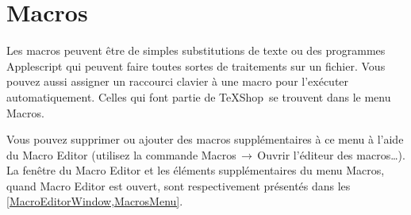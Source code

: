 \documentclass[11pt,french]{article}
\newcommand{\TS}{\textsf{\TeX Shop}}
\newcommand{\mnu}[1]{\textsf{#1}}
\newcommand{\To}{\,\(\to\)\,}
\begin{document}




\section{Macros} 

Les macros peuvent être de simples substitutions de texte ou des programmes Applescript qui peuvent faire toutes sortes de traitements sur un fichier. Vous pouvez aussi assigner un raccourci clavier à une macro pour l'exécuter automatiquement. Celles qui font partie de \TS\ se trouvent dans le menu \mnu{Macros}.

Vous pouvez supprimer ou ajouter des macros supplémentaires à ce menu à l'aide du \mnu{Macro Editor} (utilisez la commande \mnu{Macros}\To\mnu{Ouvrir l'éditeur des macros…}). La fenêtre du \mnu{Macro Editor} et les éléments supplémentaires du menu \mnu{Macros}, quand \mnu{Macro Editor} est ouvert, sont respectivement présentés dans les \vref{MacroEditorWindow,MacrosMenu}.
\end{document}
